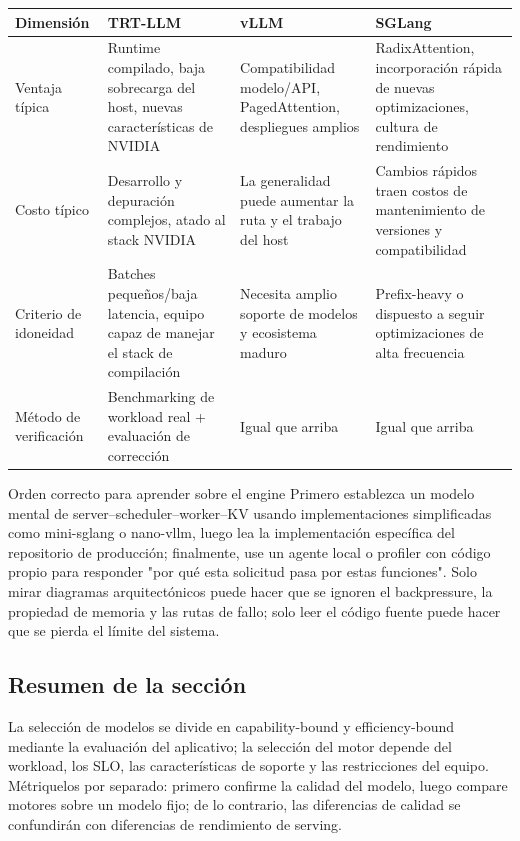 
\begin{center}
\small
\begin{tabularx}{\textwidth}{L{2.4cm}YYY}
\toprule
Dimensión & TRT-LLM & vLLM & SGLang \\
\midrule
Ventaja típica & Runtime compilado, baja sobrecarga del host, nuevas características de NVIDIA & Compatibilidad modelo/API, PagedAttention, despliegues amplios & RadixAttention, incorporación rápida de nuevas optimizaciones, cultura de rendimiento \\
Costo típico & Desarrollo y depuración complejos, atado al stack NVIDIA & La generalidad puede aumentar la ruta y el trabajo del host & Cambios rápidos traen costos de mantenimiento de versiones y compatibilidad \\
Criterio de idoneidad & Batches pequeños/baja latencia, equipo capaz de manejar el stack de compilación & Necesita amplio soporte de modelos y ecosistema maduro & Prefix-heavy o dispuesto a seguir optimizaciones de alta frecuencia \\
Método de verificación & Benchmarking de workload real + evaluación de corrección & Igual que arriba & Igual que arriba \\
\bottomrule
\end{tabularx}
\end{center}


\begin{importantbox}{Orden correcto para aprender sobre el engine}
Primero establezca un modelo mental de server--scheduler--worker--KV usando implementaciones simplificadas como mini-sglang o nano-vllm, luego lea la implementación específica del repositorio de producción; finalmente, use un agente local o profiler con código propio para responder "por qué esta solicitud pasa por estas funciones". Solo mirar diagramas arquitectónicos puede hacer que se ignoren el backpressure, la propiedad de memoria y las rutas de fallo; solo leer el código fuente puede hacer que se pierda el límite del sistema.
\end{importantbox}

\subsection{Resumen de la sección}

La selección de modelos se divide en capability-bound y efficiency-bound mediante la evaluación del aplicativo; la selección del motor depende del workload, los SLO, las características de soporte y las restricciones del equipo. Métriquelos por separado: primero confirme la calidad del modelo, luego compare motores sobre un modelo fijo; de lo contrario, las diferencias de calidad se confundirán con diferencias de rendimiento de serving.
